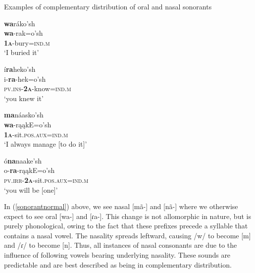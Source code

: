 \begin{exe}
\item\label{sonorantnormal} Examples of complementary distribution of oral and nasal sonorants

	\begin{xlist}
	\item\label{sonorantnormal1} \glll \textbf{wa}ráko'sh\\
		\textbf{wa}-rak=o'sh\\
		\textbf{\textsc{1a}}-\textnormal{bury}=\textsc{ind.m}\\
		\glt `I buried it'

	\item\label{sonorantnormal2} \glll í\textbf{ra}heko'sh\\
		i-\textbf{ra}-hek=o'sh\\
		\textsc{pv.ins-\textbf{2a}}-\textnormal{know}=\textsc{ind.m}\\
		\glt `you knew it' \citep[71]{hollow1970}

	\item\label{sonorantnormal3} \glll \textbf{ma}náasko'sh\\
		\textbf{wa}-rąąkE=o'sh\\
		\textsc{\textbf{1a}}-\textnormal{sit}.\textsc{pos.aux=ind.m}\\
		\glt `I always manage [to do it]' \citep[54]{hollow1973a}

	\item\label{sonorantnormal4} \glll ó\textbf{na}naake'sh\\
		o-\textbf{ra}-rąąkE=o'sh\\
		\textsc{pv.irr-\textbf{2a}}-\textnormal{sit}.\textsc{pos.aux=ind.m}\\
		\glt `you will be [one]' \citep[187]{hollow1973a}

	\end{xlist}
\end{exe}

In (\ref{sonorantnormal}) above, we see nasal [mã-] and [nã-] where we  otherwise expect to see oral [wa-] and [ɾa-]. This change is not allomorphic in nature, but is purely phonological, owing to the fact that these prefixes precede a syllable that contains a nasal vowel. The nasality spreads leftward, causing /w/ to become [m] and /ɾ/ to become [n]. Thus, all instances of nasal consonants are due to the influence of following vowels bearing underlying nasality. These sounds are predictable and are best described as being in complementary distribution.

